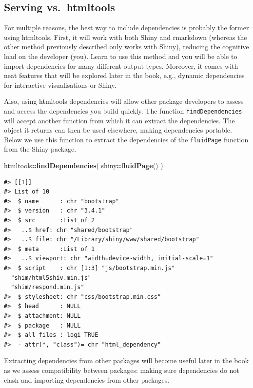 \documentclass[10pt,]{krantz}
\makeatletter
\newenvironment{Shaded}{\begin{snugshade}}{\end{snugshade}}
\newcommand{\KeywordTok}[1]{\textcolor[rgb]{0.27,0.27,0.27}{\textbf{#1}}}
\newcommand{\NormalTok}[1]{#1}
\newcommand{\OperatorTok}[1]{\textcolor[rgb]{0.43,0.43,0.43}{\textbf{#1}}}
\newenvironment{kframe}{%
\medskip{}
\setlength{\fboxsep}{.8em}
 \def\at@end@of@kframe{}%
 \ifinner\ifhmode%
  \def\at@end@of@kframe{\end{minipage}}%
  \begin{minipage}{\columnwidth}%
 \fi\fi%
 \def\FrameCommand##1{\hskip\@totalleftmargin \hskip-\fboxsep
 \colorbox{shadecolor}{##1}\hskip-\fboxsep
     \hskip-\linewidth \hskip-\@totalleftmargin \hskip\columnwidth}%
 \MakeFramed {\advance\hsize-\width
   \@totalleftmargin\z@ \linewidth\hsize
   \@setminipage}}%
 {\par\unskip\endMakeFramed%
 \at@end@of@kframe}
\renewenvironment{Shaded}{\begin{kframe}}{\end{kframe}}
\makeatother
\begin{document}
\hypertarget{basics-deps-pro-cons}{%
\subsection{Serving vs.~htmltools}\label{basics-deps-pro-cons}}

For multiple reasons, the best way to include dependencies is probably the former using htmltools. First, it will work with both Shiny and rmarkdown \citep{R-rmarkdown} (whereas the other method previously described only works with Shiny), reducing the cognitive load on the developer (you). Learn to use this method and you will be able to import dependencies for many different output types. Moreover, it comes with neat features that will be explored later in the book, e.g., dynamic dependencies for interactive visualisations or Shiny.

Also, using htmltools dependencies will allow other package developers to assess and access the dependencies you build quickly. The function \texttt{findDependencies} will accept another function from which it can extract the dependencies. The object it returns can then be used elsewhere, making dependencies portable. Below we use this function to extract the dependencies of the \texttt{fluidPage} function from the Shiny package.

\begin{Shaded}
\begin{Highlighting}[]
\NormalTok{htmltools}\OperatorTok{::}\KeywordTok{findDependencies}\NormalTok{(}
\NormalTok{  shiny}\OperatorTok{::}\KeywordTok{fluidPage}\NormalTok{()}
\NormalTok{) }
\end{Highlighting}
\end{Shaded}

\begin{verbatim}
#> [[1]]
#> List of 10
#>  $ name      : chr "bootstrap"
#>  $ version   : chr "3.4.1"
#>  $ src       :List of 2
#>   ..$ href: chr "shared/bootstrap"
#>   ..$ file: chr "/Library/shiny/www/shared/bootstrap"
#>  $ meta      :List of 1
#>   ..$ viewport: chr "width=device-width, initial-scale=1"
#>  $ script    : chr [1:3] "js/bootstrap.min.js" 
  "shim/html5shiv.min.js" 
  "shim/respond.min.js"
#>  $ stylesheet: chr "css/bootstrap.min.css"
#>  $ head      : NULL
#>  $ attachment: NULL
#>  $ package   : NULL
#>  $ all_files : logi TRUE
#>  - attr(*, "class")= chr "html_dependency"
\end{verbatim}

Extracting dependencies from other packages will become useful later in the book as we assess compatibility between packages: making sure dependencies do not clash and importing dependencies from other packages.
\end{document}
